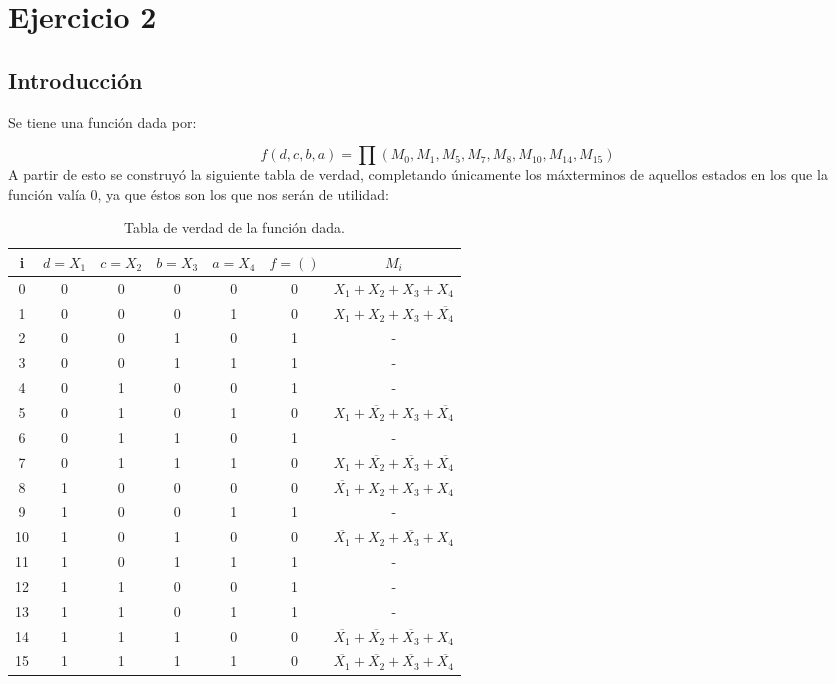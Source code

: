\section{Ejercicio 2}
\subsection{Introducción}
\newcommand\Tstrut{\rule{0pt}{2.4ex}}
Se tiene una función dada por:

\[
	f(d,c,b,a)=\prod\left(M_{0},M_{1},M_{5},M_{7},M_{8},M_{10},M_{14},M_{15}\right)
\]
\vspace{5mm}
A partir de esto se construyó la siguiente tabla de verdad, completando únicamente los máxterminos de aquellos estados en los que la función valía 0, ya que éstos son los que nos serán de utilidad:

\begin{table}[h!]
    \caption{Tabla de verdad de la función dada.}
    \begin{center}
        \begin{tabular}{|c|c|c|c|c|c|c|}
        \hline
        i   & $d=X_1$ & $c=X_2$ & $b=X_3$ & $a=X_4$ & $f=()$ & $M_i$ \\\hline
        0   &  0 & 0 & 0 & 0 & 0 & \(X_{1}+X_{2}+X_{3}+X_{4}\) \\ \hline
        1   &  0 & 0 & 0 & 1 & 0 & \(X_{1}+X_{2}+X_{3}+\overline{X_{4}}\)\Tstrut\\ \hline
        2   &  0 & 0 & 1 & 0 & 1 & -\\ \hline
        3   &  0 & 0 & 1 & 1 & 1 & -\\ \hline
        4   &  0 & 1 & 0 & 0 & 1 & -\\\hline
        5   &  0 & 1 & 0 & 1 & 0 & \(X_{1}+\overline{X_{2}}+X_{3}+\overline{X_{4}}\)\Tstrut\\ \hline
        6   &  0 & 1 & 1 & 0 & 1 & -\\ \hline
        7   &  0 & 1 & 1 & 1 & 0 & \(X_{1}+\overline{X_{2}}+\overline{X_{3}}+\overline{X_{4}}\)\Tstrut\\ \hline
        8   &  1 & 0 & 0 & 0 & 0 & \(\overline{X_{1}}+X_{2}+X_{3}+X_{4}\)\Tstrut\\ \hline
        9   &  1 & 0 & 0 & 1 & 1 & -\\ \hline
        10  &  1 & 0 & 1 & 0 & 0 & \(\overline{X_{1}}+X_{2}+\overline{X_{3}}+X_{4}\)\Tstrut\\ \hline
        11  &  1 & 0 & 1 & 1 & 1 & -\\ \hline
        12  &  1 & 1 & 0 & 0 & 1 & -\\ \hline
        13  &  1 & 1 & 0 & 1 & 1 & -\\ \hline
        14  &  1 & 1 & 1 & 0 & 0 & \(\overline{X_{1}}+\overline{X_{2}}+\overline{X_{3}}+X_{4}\)\Tstrut\\ \hline
        15  &  1 & 1 & 1 & 1 & 0 & \(\overline{X_{1}}+\overline{X_{2}}+\overline{X_{3}}+\overline{X_{4}}\)\Tstrut\\ \hline
        \end{tabular}
    \end{center}
    \label{table:2.1}
\end{table}


